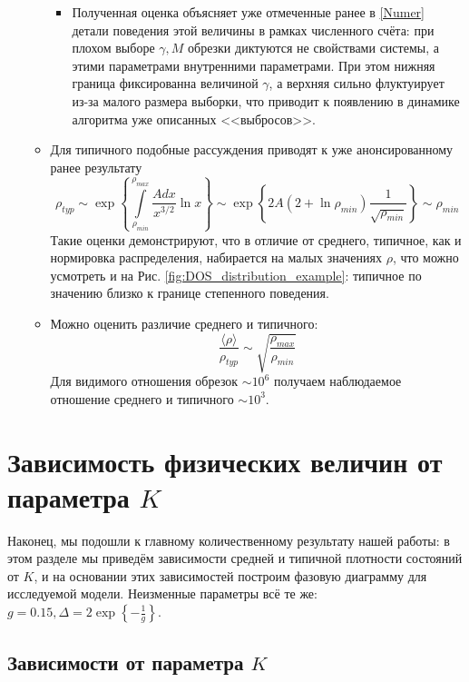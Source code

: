 \begin{enumerate}
\begin{itemize}
		\begin{itemize}
			\item Полученная оценка объясняет уже отмеченные ранее в \autoref{Numer} детали поведения этой величины в рамках численного счёта: при плохом выборе $\gamma, M$ обрезки диктуются не свойствами системы, а этими параметрами внутренними параметрами. При этом нижняя граница фиксированна величиной $\gamma$, а верхняя сильно флуктуирует из-за малого размера выборки, что приводит к появлению в динамике алгоритма уже описанных <<выбросов>>.
		\end{itemize}
		\item Для типичного подобные рассуждения приводят к уже анонсированному ранее результату
		$$
		\rho_{typ} \sim \exp\left\{ \int \limits_{ \rho_{min} }^{ \rho_{max} } \frac{A dx}{x^{3/2}} \ln x \right\} \sim \exp\left\{ 2 A \left( 2 + \ln \rho_{min} \right) \frac{1}{ \sqrt{\rho_{min}} } \right\} \sim \rho_{min}
		$$
		Такие оценки демонстрируют, что в отличие от среднего, типичное, как и нормировка распределения, набирается на малых значениях $\rho$, что можно усмотреть и на Рис. \ref{fig:DOS_distribution_example}: типичное по значению близко к границе степенного поведения.
		\item Можно оценить различие среднего и типичного:
		$$ \frac{ \langle \rho \rangle }{ \rho_{typ} } \sim \sqrt{\frac{ \rho_{max} }{ \rho_{min} }} $$
		Для видимого отношения обрезок $\sim 10^6$ получаем наблюдаемое отношение среднего и типичного $\sim 10^3$.
	\end{itemize}
\end{enumerate}



\section{Зависимость физических величин от параметра $K$}
Наконец, мы подошли к главному количественному результату нашей работы: в этом разделе мы приведём зависимости средней и типичной плотности состояний от $K$, и на основании этих зависимостей построим фазовую диаграмму для исследуемой модели. Неизменные параметры всё те же: $g = 0.15, \Delta = 2 \exp \left\{ -\frac{1}{g} \right\}$.


\subsection{Зависимости от параметра $K$}

